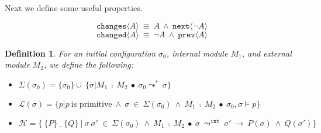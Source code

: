 \documentclass[12pt]{article}
\newtheorem{definition}{Definition}
\begin{document}
Next we define some useful properties.

$$\texttt{changes}\langle A \rangle\ \equiv\ A\ \wedge\ \texttt{next}\langle \neg A \rangle$$
$$\texttt{changed}\langle A \rangle\ \equiv\ \neg A\ \wedge\ \texttt{prev}\langle A \rangle$$



\begin{definition}
For an initial configuration $\sigma_0$, internal module $M_1$, and external module $M_2$, we define the following:
\begin{itemize}
\item
$\Sigma(\sigma_0) = \{\sigma_0\} \cup\ \{\sigma | M_1\ \fcmp\ M_2\ \bullet\ \sigma_0 \leadsto^*\ \sigma\}$
\item
$\mathcal{L}(\sigma) = \{p | p\ \text{is primitive}\ \wedge\ \sigma\ \in\ \Sigma(\sigma_0)\ \wedge\ M_1\ \fcmp\ M_2\ \bullet\ \sigma_0, \sigma \vDash p\}$
\item
$\mathcal{H} = \{\ \{P\}\ \_\ \{Q\}\ |\ \sigma\ \sigma'\ \in\ \Sigma(\sigma_0)\ \wedge\ M_1\ \fcmp\ M_2\ \bullet\ \sigma\ \leadsto^\texttt{int}\ \sigma'\ \longrightarrow\ P(\sigma)\ \wedge\ Q(\sigma') \}$
\end{itemize}
\end{definition}
\end{document}
